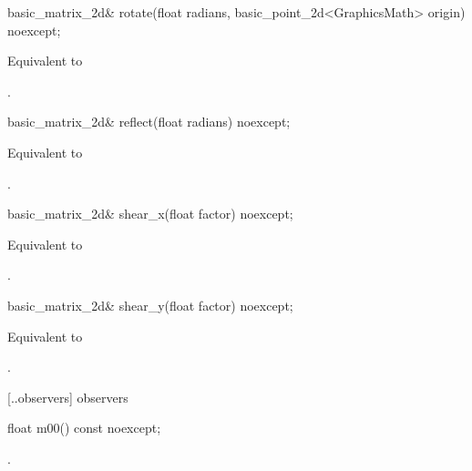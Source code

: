 %
\begin{itemdecl}
basic_matrix_2d& rotate(float radians, basic_point_2d<GraphicsMath> origin) noexcept;
\end{itemdecl}
\begin{itemdescr}
\pnum
\effects
Equivalent to 

\pnum
\returns
{}.
\end{itemdescr}

%
\begin{itemdecl}
basic_matrix_2d& reflect(float radians) noexcept;
\end{itemdecl}
\begin{itemdescr}
\pnum
\effects
Equivalent to 

\pnum
\returns
{}.
\end{itemdescr}

%
\begin{itemdecl}
basic_matrix_2d& shear_x(float factor) noexcept;
\end{itemdecl}
\begin{itemdescr}
\pnum
\effects
Equivalent to 

\pnum
\returns
{}.
\end{itemdescr}

%
\begin{itemdecl}
basic_matrix_2d& shear_y(float factor) noexcept;
\end{itemdecl}
\begin{itemdescr}
\pnum
\effects
Equivalent to 

\pnum
\returns
{}.
\end{itemdescr}

 [\iotwod.\matrixtwod.observers] { observers}

%
\begin{itemdecl}
float m00() const noexcept;
\end{itemdecl}
\begin{itemdescr}
\pnum
\returns
{}.
\end{itemdescr}

